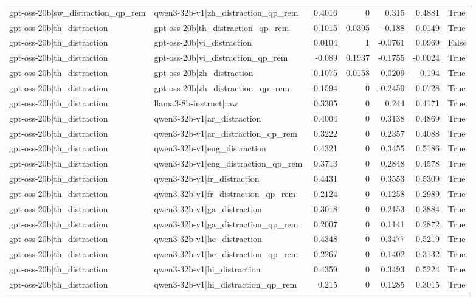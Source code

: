 \begin{table}
\begin{tabular}{l l r r r r l}
gpt-oss-20b|sw_distraction_qp_rem & qwen3-32b-v1|zh_distraction_qp_rem & 0.4016 & 0 & 0.315 & 0.4881 & True \\
gpt-oss-20b|th_distraction & gpt-oss-20b|th_distraction_qp_rem & -0.1015 & 0.0395 & -0.188 & -0.0149 & True \\
gpt-oss-20b|th_distraction & gpt-oss-20b|vi_distraction & 0.0104 & 1 & -0.0761 & 0.0969 & False \\
gpt-oss-20b|th_distraction & gpt-oss-20b|vi_distraction_qp_rem & -0.089 & 0.1937 & -0.1755 & -0.0024 & True \\
gpt-oss-20b|th_distraction & gpt-oss-20b|zh_distraction & 0.1075 & 0.0158 & 0.0209 & 0.194 & True \\
gpt-oss-20b|th_distraction & gpt-oss-20b|zh_distraction_qp_rem & -0.1594 & 0 & -0.2459 & -0.0728 & True \\
gpt-oss-20b|th_distraction & llama3-8b-instruct|raw & 0.3305 & 0 & 0.244 & 0.4171 & True \\
gpt-oss-20b|th_distraction & qwen3-32b-v1|ar_distraction & 0.4004 & 0 & 0.3138 & 0.4869 & True \\
gpt-oss-20b|th_distraction & qwen3-32b-v1|ar_distraction_qp_rem & 0.3222 & 0 & 0.2357 & 0.4088 & True \\
gpt-oss-20b|th_distraction & qwen3-32b-v1|eng_distraction & 0.4321 & 0 & 0.3455 & 0.5186 & True \\
gpt-oss-20b|th_distraction & qwen3-32b-v1|eng_distraction_qp_rem & 0.3713 & 0 & 0.2848 & 0.4578 & True \\
gpt-oss-20b|th_distraction & qwen3-32b-v1|fr_distraction & 0.4431 & 0 & 0.3553 & 0.5309 & True \\
gpt-oss-20b|th_distraction & qwen3-32b-v1|fr_distraction_qp_rem & 0.2124 & 0 & 0.1258 & 0.2989 & True \\
gpt-oss-20b|th_distraction & qwen3-32b-v1|ga_distraction & 0.3018 & 0 & 0.2153 & 0.3884 & True \\
gpt-oss-20b|th_distraction & qwen3-32b-v1|ga_distraction_qp_rem & 0.2007 & 0 & 0.1141 & 0.2872 & True \\
gpt-oss-20b|th_distraction & qwen3-32b-v1|he_distraction & 0.4348 & 0 & 0.3477 & 0.5219 & True \\
gpt-oss-20b|th_distraction & qwen3-32b-v1|he_distraction_qp_rem & 0.2267 & 0 & 0.1402 & 0.3132 & True \\
gpt-oss-20b|th_distraction & qwen3-32b-v1|hi_distraction & 0.4359 & 0 & 0.3493 & 0.5224 & True \\
gpt-oss-20b|th_distraction & qwen3-32b-v1|hi_distraction_qp_rem & 0.215 & 0 & 0.1285 & 0.3015 & True \\

\end{tabular}
\end{table}
